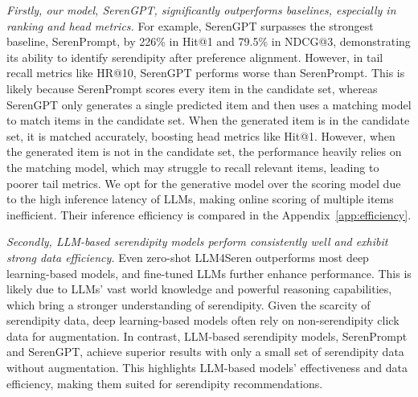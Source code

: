 \textit{Firstly, our model, SerenGPT, significantly outperforms baselines, especially in ranking and head metrics.} For example, SerenGPT surpasses the strongest baseline, SerenPrompt, by 226\% in Hit@1 and 79.5\% in NDCG@3, demonstrating its ability to identify serendipity after preference alignment. However, in tail recall metrics like HR@10, SerenGPT performs worse than SerenPrompt. This is likely because SerenPrompt scores every item in the candidate set, whereas SerenGPT only generates a single predicted item and then uses a matching model to match items in the candidate set. When the generated item is in the candidate set, it is matched accurately, boosting head metrics like Hit@1. However, when the generated item is not in the candidate set, the performance heavily relies on the matching model, which may struggle to recall relevant items, leading to poorer tail metrics. We opt for the generative model over the scoring model due to the high inference latency of LLMs, making online scoring of multiple items inefficient. Their inference efficiency is compared in the Appendix~\ref{app:efficiency}.

\textit{Secondly, LLM-based serendipity models perform consistently well and exhibit strong data efficiency.} Even zero-shot LLM4Seren outperforms most deep learning-based models, and fine-tuned LLMs further enhance performance. This is likely due to LLMs' vast world knowledge and powerful reasoning capabilities, which bring a stronger understanding of serendipity. Given the scarcity of serendipity data, deep learning-based models often rely on non-serendipity click data for augmentation. In contrast, LLM-based serendipity models, SerenPrompt and SerenGPT, achieve superior results with only a small set of serendipity data without augmentation. This highlights LLM-based models' effectiveness and data efficiency, making them suited for serendipity recommendations.


